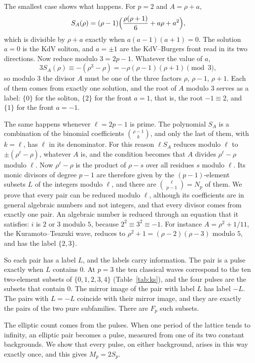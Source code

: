 \documentclass[11pt]{article}
\theoremstyle{definition}
\theoremstyle{remark}
\numberwithin{equation}{section}
\begin{document}
The smallest case shows what happens. For \(p=2\) and \(A=\rho+a\),
\[
 S_A(\rho)=(\rho-1)\Bigl(\frac{\rho(\rho+1)}6+a\rho+a^2\Bigr),
\]
which is divisible by \(\rho+a\) exactly when \(a(a-1)(a+1)=0\). The
solution \(a=0\) is the KdV soliton, and \(a=\pm1\) are the KdV--Burgers
front read in its two directions. Now reduce modulo \(3=2p-1\). Whatever
the value of \(a\),
\[
 3S_A(\rho)\equiv-(\rho^3-\rho)=-\rho(\rho-1)(\rho+1)\pmod3,
\]
so modulo \(3\) the divisor \(A\) must be one of the three factors
\(\rho\), \(\rho-1\), \(\rho+1\). Each of them comes from exactly one
solution, and the root of \(A\) modulo \(3\) serves as a label:
\(\{0\}\) for the soliton, \(\{2\}\) for the front \(a=1\), that is, the
root \(-1\equiv2\), and \(\{1\}\) for the front \(a=-1\).

The same happens whenever \(\ell=2p-1\) is prime. The polynomial \(S_A\)
is a combination of the binomial coefficients \(\binom{\rho-1}{k}\), and
only the last of them, with \(k=\ell\), has \(\ell\) in its denominator.
For this reason \(\ell S_A\) reduces modulo \(\ell\) to
\(\pm(\rho^\ell-\rho)\), whatever \(A\) is, and the condition becomes
that \(A\) divides \(\rho^\ell-\rho\) modulo \(\ell\). Now
\(\rho^\ell-\rho\) is the product of \(\rho-s\) over all residues \(s\)
modulo \(\ell\). Its monic divisors of degree \(p-1\) are therefore
given by the \((p-1)\)-element subsets \(L\) of the integers modulo
\(\ell\), and there are \(\binom{\ell}{p-1}=N_p\) of them. We prove that
every pair can be reduced modulo \(\ell\), although its coefficients are
in general algebraic numbers and not integers, and that every divisor
comes from exactly one pair. An algebraic number is reduced through an
equation that it satisfies: \(i\) is \(2\) or \(3\) modulo \(5\),
because \(2^2\equiv3^2\equiv-1\). For instance \(A=\rho^2+1/11\), the
Kuramoto--Tsuzuki wave, reduces to \(\rho^2+1=(\rho-2)(\rho-3)\) modulo
\(5\), and has the label \(\{2,3\}\).

So each pair has a label \(L\), and the labels carry information. The
pair is a pulse exactly when \(L\) contains \(0\). At \(p=3\) the ten
classical waves correspond to the ten two-element subsets of
\(\{0,1,2,3,4\}\) (Table~\ref{tab:ks}), and the four pulses are the
subsets that contain \(0\). The mirror image of the pair with label
\(L\) has label \(-L\). The pairs with \(L=-L\) coincide with their
mirror image, and they are exactly the pairs of the two pure
subfamilies. There are \(F_p\) such subsets.

The elliptic count comes from the pulses. When one period of the lattice
tends to infinity, an elliptic pair becomes a pulse, measured from one
of its two constant backgrounds. We show that every pulse, on either
background, arises in this way exactly once, and this gives
\(M_p=2S_p\).
\end{document}
